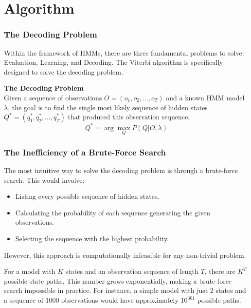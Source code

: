 \documentclass[aspectratio=43, 9pt]{beamer}
\begin{document}
\section{Algorithm}

\begin{frame}
    \frametitle{The Decoding Problem}
    Within the framework of HMMs, there are three fundamental problems to solve: Evaluation, Learning, and Decoding. The Viterbi algorithm is specifically designed to solve the decoding problem.
    
    \vspace{1em}
    
    \begin{NewDefinition}
        \textbf{The Decoding Problem} \\
        Given a sequence of observations $O = (o_1, o_2,..., o_T)$ and a known HMM model $\lambda$, the goal is to find the single most likely sequence of hidden states $Q^* = (q_1^*, q_2^*,..., q_T^*)$ that produced this observation sequence.
        $$Q^* = \arg\max_Q P(Q|O, \lambda)$$
    \end{NewDefinition}
\end{frame}

\begin{frame}
    \frametitle{The Inefficiency of a Brute-Force Search}
    The most intuitive way to solve the decoding problem is through a brute-force search. This would involve:
    \begin{itemize}
        \item Listing every possible sequence of hidden states.
        \item Calculating the probability of each sequence generating the given observations.
        \item Selecting the sequence with the highest probability.
    \end{itemize}
    
    \vspace{1em}
    
    However, this approach is computationally infeasible for any non-trivial problem.
    
    \begin{Takeaway}
        For a model with $K$ states and an observation sequence of length $T$, there are $K^T$ possible state paths. This number grows exponentially, making a brute-force search impossible in practice. For instance, a simple model with just 2 states and a sequence of 1000 observations would have approximately $10^{301}$ possible paths.
    \end{Takeaway}
\end{frame}
\end{document}
